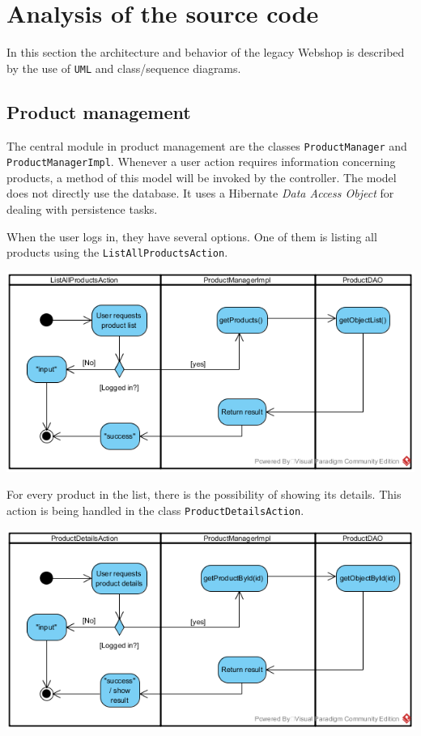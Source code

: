 \documentclass[11pt]{article}
\begin{document}
	\section{Analysis of the source code}
    In this section the architecture and behavior of the legacy Webshop is described by the use of \texttt{UML} and class/sequence diagrams.
    
    \subsection{Product management} %
	The central module in product management are the classes \texttt{ProductManager} and \texttt{ProductManagerImpl}. Whenever a user action requires information concerning products, a method of this model will be invoked by the controller. The model does not directly use the database. It uses a Hibernate \textit{Data Access Object} for dealing with persistence tasks.

    When the user logs in, they have several options. One of them is listing all products using the \texttt{ListAll\-ProductsAction}.
    
    
		\begin{center}
		\includegraphics[width=\textwidth]{img/products/list}
		\end{center}
		
		
	For every product in the list, there is the possibility of showing its details. This action is being handled in the class \texttt{ProductDetailsAction}.
	\begin{center}
	\includegraphics[width=\textwidth]{img/products/details}
	\end{center}
	
\end{document}
